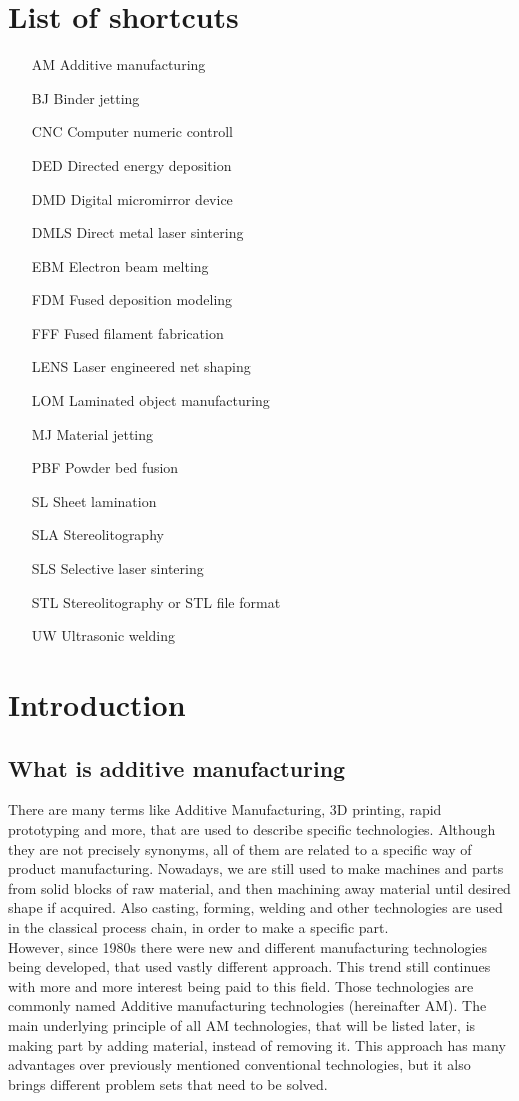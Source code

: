 \documentclass[a4paper, 11pt, reqno]{report}
\begin{document}
\chapter*{List of shortcuts}
\begin{itemize}
\item[AM]Additive manufacturing
\item[BJ]Binder jetting
\item[CNC]Computer numeric controll
\item[DED]Directed energy deposition
\item[DMD]Digital micromirror device
\item[DMLS]Direct metal laser sintering
\item[EBM]Electron beam melting
\item[FDM]Fused deposition modeling
\item[FFF]Fused filament fabrication
\item[LENS]Laser engineered net shaping
\item[LOM]Laminated object manufacturing
\item[MJ]Material jetting
\item[PBF]Powder bed fusion
\item[SL]Sheet lamination
\item[SLA]Stereolitography
\item[SLS]Selective laser sintering
\item[STL]Stereolitography or STL file format
\item[UW]Ultrasonic welding
\end{itemize}


\chapter{Introduction}
%
%
%
\section{What is additive manufacturing}
There are many terms like Additive Manufacturing, 3D printing, rapid prototyping and more, that are used to describe specific technologies. Although they are not precisely synonyms, all of them are related to a specific way of product manufacturing. Nowadays, we are still used to make machines and parts from solid blocks of raw material, and then machining away material until desired shape if acquired. Also casting, forming, welding and other technologies are used in the classical process chain, in order to make a specific part.\\
However, since 1980s there were new and different manufacturing technologies being developed, that used vastly different approach. This trend still continues with more and more interest being paid to this field. Those technologies are commonly named Additive manufacturing technologies (hereinafter AM). The main underlying principle of all AM technologies, that will be listed later, is making part by adding material, instead of removing it. This approach has many advantages over previously mentioned conventional technologies, but it also brings different problem sets that need to be solved.
\end{document}
